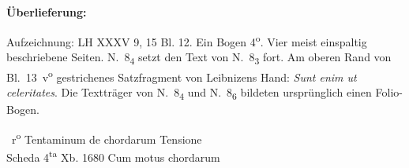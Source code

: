 %
%
%
\begin{ledgroupsized}[r]{120mm}
\footnotesize
\pstart
\noindent\textbf{Überlieferung:}
\pend
\end{ledgroupsized}
\begin{ledgroupsized}[r]{114mm}
\footnotesize
\pstart \parindent -6mm
%
Aufzeichnung: LH XXXV 9, 15 Bl. 12.
Ein Bogen 4\textsuperscript{o}.
Vier meist einspaltig beschriebene Seiten.
N.~8\textsubscript{4} setzt den Text von N.~8\textsubscript{3} fort.
Am oberen Rand von Bl.~13~v\textsuperscript{o} gestrichenes Satzfragment von Leibnizens Hand:
\textit{Sunt enim ut celeritates}.
Die Textträger von N.~8\textsubscript{4} und N.~8\textsubscript{6} bildeten ursprünglich einen Folio-Bogen.
\pend
\end{ledgroupsized}
%
%
\vspace{4mm}%
\pstart%
\count{}
\count{}
\count{}
\normalsize%
\noindent%
%
~r\textsuperscript{o}\rbrack%
%
\pend%
\pstart%
\centering%
Tentaminum\protect{}
de chordarum Tensione\protect{}\\
Scheda\protect{} 4\textsuperscript{ta}
Xb. 1680
\pend%
\vspace{0.5em}%
%
\pstart%
\noindent%
Cum
motus chordarum\protect{}%
